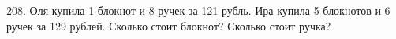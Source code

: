208. Оля купила 1 блокнот и 8 ручек за 121 рубль. Ира купила 5 блокнотов и 6 ручек за 129 рублей. Сколько стоит блокнот? Сколько стоит ручка?\\
